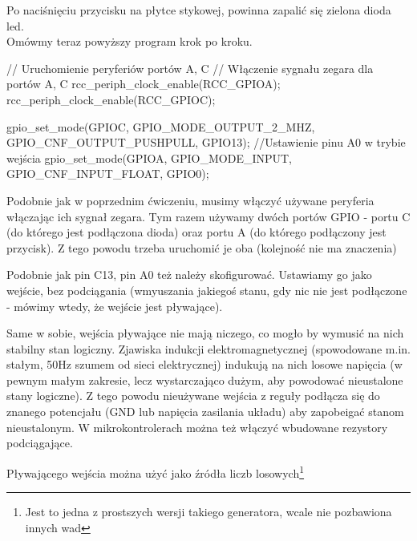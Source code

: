 \documentclass{pdfBooklets}
\begin{document}
Po naciśnięciu przycisku na płytce stykowej, powinna zapalić się zielona dioda led.
\\

Omówmy teraz powyższy program krok po kroku.

\begin{CodeFrame*}[c]{}
  // Uruchomienie peryferiów portów A, C
  // Włączenie sygnału zegara dla portów A, C
  rcc_periph_clock_enable(RCC_GPIOA);
  rcc_periph_clock_enable(RCC_GPIOC);

  gpio_set_mode(GPIOC, GPIO_MODE_OUTPUT_2_MHZ,
		GPIO_CNF_OUTPUT_PUSHPULL, GPIO13);
  //Ustawienie pinu A0 w trybie wejścia
  gpio_set_mode(GPIOA, GPIO_MODE_INPUT,
		GPIO_CNF_INPUT_FLOAT, GPIO0);

\end{CodeFrame*}

Podobnie jak w poprzednim ćwiczeniu, musimy włączyć używane peryferia włączając ich sygnał zegara. Tym razem używamy
dwóch portów GPIO - portu C (do którego jest podłączona dioda) oraz portu A (do którego podłączony jest przycisk).
Z tego powodu trzeba uruchomić je oba (kolejność nie ma znaczenia)

Podobnie jak pin C13, pin A0 też należy skofigurować\footnotemark. Ustawiamy go jako wejście, bez podciągania
(wmyuszania jakiegoś stanu, gdy nic nie jest podłączone - mówimy wtedy, że wejście jest pływające).
\\



Same w sobie, wejścia pływające nie mają niczego, co mogło by wymusić na nich stabilny stan logiczny. Zjawiska indukcji
elektromagnetycznej (spowodowane m.in. stałym, 50Hz szumem od sieci elektrycznej) indukują na nich losowe napięcia
(w pewnym małym zakresie, lecz wystarczająco dużym, aby powodować nieustalone stany logiczne). Z tego powodu
nieużywane wejścia z reguły podłącza się do znanego potencjału (GND lub napięcia zasilania układu) aby zapobeigać
stanom nieustalonym. W mikrokontrolerach można też włączyć wbudowane rezystory podciągające.

Pływającego wejścia można użyć jako źródła liczb losowych\footnote{Jest to jedna z prostszych wersji takiego
  generatora, wcale nie pozbawiona innych wad}
\end{document}
